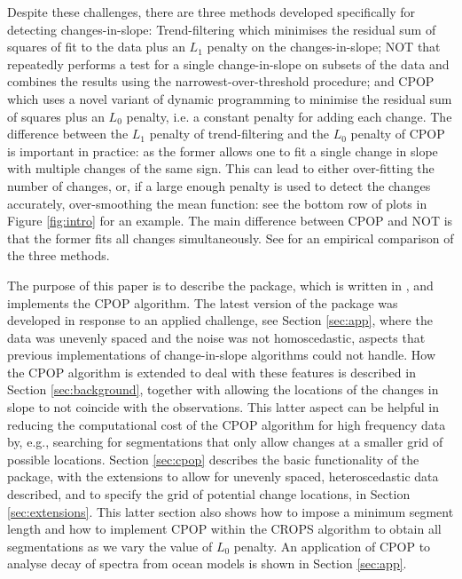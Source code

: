 \documentclass[article]{jss}
\begin{document}
Despite these challenges, there are three methods developed specifically for detecting changes-in-slope: Trend-filtering \citep{kim2009ell_1,tibshirani2014adaptive} which minimises the residual sum of squares of fit to the data plus an $L_1$ penalty on the changes-in-slope; NOT \citep{baranowski2016narrowest} that repeatedly performs a test for a single change-in-slope on subsets of the data and combines the results using the narrowest-over-threshold procedure; and CPOP \citep{fearnhead2019detecting} which uses a novel variant of dynamic programming to minimise the residual sum of squares plus an $L_0$ penalty, i.e. a constant penalty for adding each change. The difference between the $L_1$ penalty of trend-filtering and the $L_0$ penalty of CPOP is important in practice: as the former allows one to fit a single change in slope with multiple changes of the same sign. This can lead to either over-fitting the number of changes, or, if a large enough penalty is used to detect the changes accurately, over-smoothing the mean function: see the bottom row of plots in Figure \ref{fig:intro} for an example. The main difference between CPOP and NOT is that the former fits all changes simultaneously. See \cite{fearnhead2019detecting} for an empirical comparison of the three methods.

The purpose of this paper is to describe the  package, which is written in , and implements the CPOP algorithm. The latest version of the package was developed in response to an applied challenge, see Section \ref{sec:app}, where the data was unevenly spaced and the noise was not homoscedastic, aspects that previous implementations of change-in-slope algorithms could not handle. How the CPOP algorithm is extended to deal with these features is described in Section \ref{sec:background}, together with allowing the locations of the changes in slope to not coincide with the observations. This latter aspect can be helpful in reducing the computational cost of the CPOP algorithm for high frequency data by, e.g., searching for segmentations that only allow changes at a smaller grid of possible locations. Section \ref{sec:cpop} describes the basic functionality of the package, with the extensions to allow for unevenly spaced, heteroscedastic data described, and to specify the grid of potential change locations, in Section \ref{sec:extensions}. This latter section also shows how to impose a minimum segment length and how to implement CPOP within the CROPS algorithm \citep{haynes2017computationally} to obtain all segmentations as we vary the value of $L_0$ penalty. An application of CPOP to analyse decay of spectra from ocean models is shown in Section \ref{sec:app}.
\end{document}
